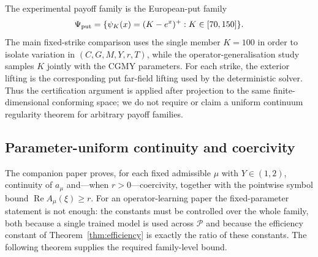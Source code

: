 \documentclass[11pt]{amsart}
\theoremstyle{remark}
\newcommand{\Pset}{\mathcal{P}}
\newcommand{\rf}{r}
\DeclareMathOperator{\Real}{Re}
\begin{document}
The experimental payoff family is the European-put family
\[
  \Psi_{\rm put}=\{\psi_K(x)=(K-e^x)^+ : K\in[70,150]\}.
\]
The main fixed-strike comparison uses the single member $K=100$ in order to
isolate variation in $(C,G,M,Y,r,T)$, while the operator-generalisation study
samples $K$ jointly with the CGMY parameters.  For each strike, the exterior
lifting is the corresponding put far-field lifting used by the deterministic
solver.  Thus the certification argument is applied after projection to the
same finite-dimensional conforming space; we do not require or claim a
uniform continuum regularity theorem for arbitrary payoff families.

\subsection{Parameter-uniform continuity and coercivity}
\label{ssec:uniform}

The companion paper proves, for each fixed admissible $\mu$ with $Y\in(1,2)$,
continuity of $a_\mu$ and---when $\rf>0$---coercivity, together with the
pointwise symbol bound $\Real A_\mu(\xi)\ge \rf$.  For an operator-learning
paper the fixed-parameter statement is not enough: the constants must be
controlled over the whole family, both because a single trained model is used
across $\Pset$ and because the efficiency constant of
Theorem~\ref{thm:efficiency} is exactly the ratio of these constants.  The following theorem supplies the required family-level bound.
\end{document}
